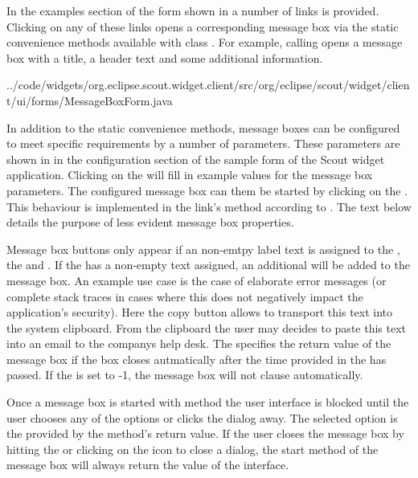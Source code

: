 \documentclass[a4paper,10pt,twoside]{book}
\begin{document}
In the examples section of the  form shown in  a number of links is provided. 
Clicking on any of these links opens a corresponding message box via the static convenience methods available with class . 
For example, calling  opens a message box with a title, a header text and some additional information. 


{../code/widgets/org.eclipse.scout.widget.client/src/org/eclipse/scout/widget/client/ui/forms/MessageBoxForm.java}

In addition to the static convenience methods, message boxes can be configured to meet specific requirements by a number of parameters. 
These parameters are shown in  in the configuration section of the sample form  of the Scout widget application.  
Clicking on the  will fill in example values for the message box parameters. 
The configured message box can them be started by clicking on the . 
This behaviour is implemented in the link's  method according to . 
The text below details the purpose of less evident message box properties.

Message box buttons only appear if an non-emtpy label text is assigned to the , the  and . 
If the  has a non-empty text assigned, an additional  will be added to the message box. 
An example use case is the case of elaborate error messages (or complete stack traces in cases where this does not negatively impact the application's security). 
Here the copy button allows to transport this text into the system clipboard. 
From the clipboard the user may decides to paste this text into an email to the companys help desk. 
The  specifies the return value of the message box if the box closes autmatically after the time provided in the  has passed. 
If the  is set to -1, the message box will not clause automatically. 

Once a message box is started with method  the user interface is blocked until the user chooses any of the options or clicks the dialog away. 
The selected option is the provided by the method's return value. 
If the user closes the message box by hitting the  or clicking on the icon to close a dialog, the start method of the message box will always return the value  of the  interface.
\end{document}
